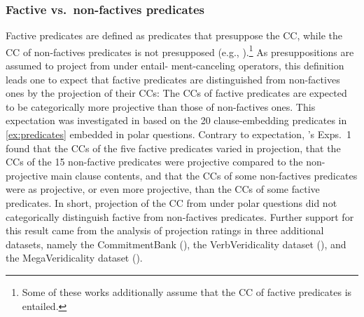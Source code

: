 \documentclass[a4paper,12pt,twoside]{article}
\newcommand{\poscite}[1]{\citeauthor{#1}'s \citeyear{#1}}
\begin{document}
	\subsubsection{Factive vs.\ non-factives predicates}\label{s:factivity}

Factive predicates are defined as predicates that presuppose the CC, while the CC of non-factives predicates is not presupposed (e.g., \citealt{kiparsky_fact_1970,karttunen_observations_1971,schlenker10,abrusan_predicting_2011}).\footnote{Some of these works additionally assume that the CC of factive predicates is entailed.} As presuppositions are assumed to project from under entail- ment-canceling operators, this definition leads one to expect that factive predicates are distinguished from non-factives ones by the projection of their CCs: The CCs of factive predicates are expected to be categorically more projective than those of non-factives ones. This expectation was investigated in \citealt{degen_are_2022} based on the 20 clause-embedding predicates in \ref{ex:predicates} embedded in polar questions. Contrary to expectation,  \poscite{degen_are_2022} Exps.~1 found that the CCs of the five factive predicates varied in projection, that the CCs of the 15 non-factive predicates were projective compared to the non-projective main clause contents, and that the CCs of some non-factives predicates were as projective, or even more projective, than the CCs of some factive predicates.  In short, projection of the CC from under polar questions did not categorically distinguish factive from non-factives predicates. Further support for this result came from the analysis of projection ratings in three additional datasets, namely the CommitmentBank (\citealt{demarneffe-etal-sub23}), the VerbVeridicality dataset (\citealt{ross-pavlick2019}), and the MegaVeridicality  dataset (\citealt{white_role_2018}).
\end{document}
